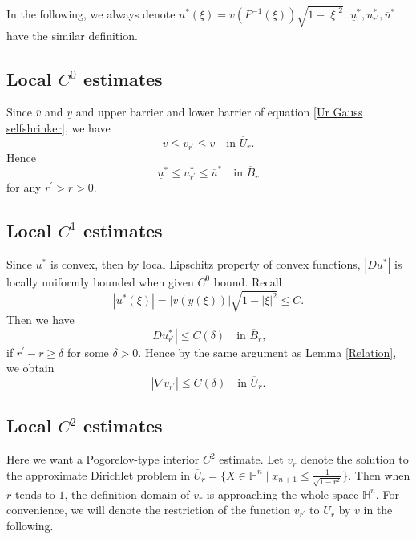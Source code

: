 \documentclass[reqno]{amsart}
\theoremstyle{remark}
\theoremstyle{definition}
\numberwithin{equation}{section}
\begin{document}
In the following, we always denote $u^*(\xi)=v(P^{-1}(\xi))\sqrt{1-|\xi|^2}$.  $\underline{u}^*, u^*_{r^{\prime}}, \overline{u}^*$ have the similar definition.  

\subsection{Local \texorpdfstring{$C^0$}{C0} estimates}

Since $\overline{v}$ and $\underline{v}$ and upper barrier and lower barrier of equation \eqref{Ur Gauss selfshrinker}, we have
\[
\underline{v} \leqslant v_{r^{\prime}} \leqslant \overline{v} \quad \text{in } \overline{U}_r.
\]
Hence
\[
\underline{u}^* \leqslant u^*_{r^{\prime}} \leqslant \overline{u}^* \quad \text{in } \overline{B}_r
\]
for any $r^{\prime}>r>0$.


\subsection{Local \texorpdfstring{$C^1$}{C1} estimates}\label{Gauss Local C1}

Since $u^*$ is convex, then by local Lipschitz property of convex functions, $|D u^*|$ is locally uniformly bounded when given $C^0$ bound. Recall 
\[
|u^*(\xi)| = |v(y(\xi))| \sqrt{1 - |\xi |^2} \leqslant C.
\]
Then we have
\[
|D u^*_{r^{\prime}}| \leqslant C(\delta) \quad \text{in } \overline{B}_r,
\]
if $r^{\prime} - r \geqslant \delta$ for some $\delta > 0$. Hence by the same argument as Lemma \ref{Relation}, we obtain
\[
|\nabla v_{r^{\prime}}| \leqslant C(\delta) \quad \text{in } \overline{U}_r.
\]


\subsection{Local \texorpdfstring{$C^2$}{C2} estimates}\label{Gauss Local C2}

Here we want a Pogorelov-type interior $C^2$ estimate. Let $v_r$ denote the solution to the approximate Dirichlet problem in $\overline{U}_r = \{X \in \mathbb{H}^n \mid x_{n+1} \leqslant \frac{1}{\sqrt{1-r^2}}\}$. Then when $r$ tends to $1$, the definition domain of $v_r$ is approaching the whole space $\mathbb{H}^n$. For convenience, we will denote the restriction of the function $v_{r^{\prime}}$ to $U_r$ by $v$ in the following.
\end{document}
